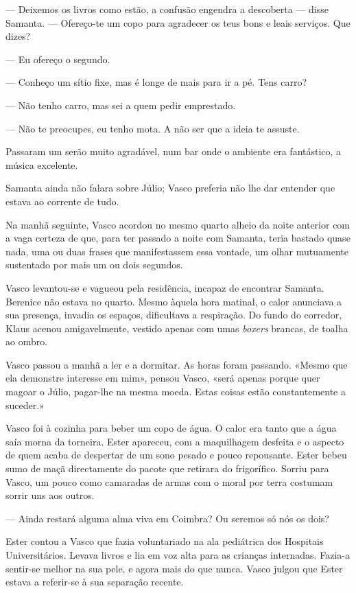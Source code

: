 --- Deixemos os livros como estão, a confusão engendra a descoberta ---
  disse Samanta. --- Ofereço-te um copo para agradecer os teus bons e
  leais serviços. Que dizes?


--- Eu ofereço o segundo.

--- Conheço um sítio fixe, mas é longe de mais para ir a pé. Tens carro?

--- Não tenho carro, mas sei a quem pedir emprestado.

--- Não te preocupes, eu tenho mota. A não ser que a ideia te assuste.


Passaram um serão muito agradável, num bar onde o ambiente era
fantástico, a música excelente.

Samanta ainda não falara sobre Júlio; Vasco preferia não lhe dar
entender que estava ao corrente de tudo.

Na manhã seguinte, Vasco acordou no mesmo quarto alheio da noite
anterior com a vaga certeza de que, para ter passado a noite com
Samanta, teria bastado quase nada, uma ou duas frases que manifestassem
essa vontade, um olhar mutuamente sustentado por mais um ou dois
segundos.

Vasco levantou-se e vagueou pela residência, incapaz de encontrar
Samanta. Berenice não estava no quarto. Mesmo àquela hora matinal, o
calor anunciava a sua presença, invadia os espaços, dificultava a
respiração. Do fundo do corredor, Klaus acenou amigavelmente, vestido
apenas com umas \emph{boxers }brancas, de toalha ao ombro.

Vasco passou a manhã a ler e a dormitar. As horas foram passando. «Mesmo
que ela demonstre interesse em mim», pensou Vasco, «será apenas porque
quer magoar o Júlio, pagar-lhe na mesma moeda. Estas coisas estão
constantemente a suceder.»

Vasco foi à cozinha para beber um copo de água. O calor era tanto que a
água saía morna da torneira. Ester apareceu, com a maquilhagem desfeita
e o aspecto de quem acaba de despertar de um sono pesado e pouco
repousante. Ester bebeu sumo de maçã directamente do pacote que retirara
do frigorífico. Sorriu para Vasco, um pouco como camaradas de armas com o moral
por terra costumam sorrir uns aos outros.

--- Ainda restará alguma alma viva em Coimbra? Ou seremos só nós os
  dois?


Ester contou a Vasco que fazia voluntariado na ala pediátrica dos
Hospitais Universitários. Levava livros e lia em voz alta para as
crianças internadas. Fazia-a sentir-se melhor na sua pele, e agora mais
do que nunca. Vasco julgou que Ester estava a referir-se à sua separação
recente.

